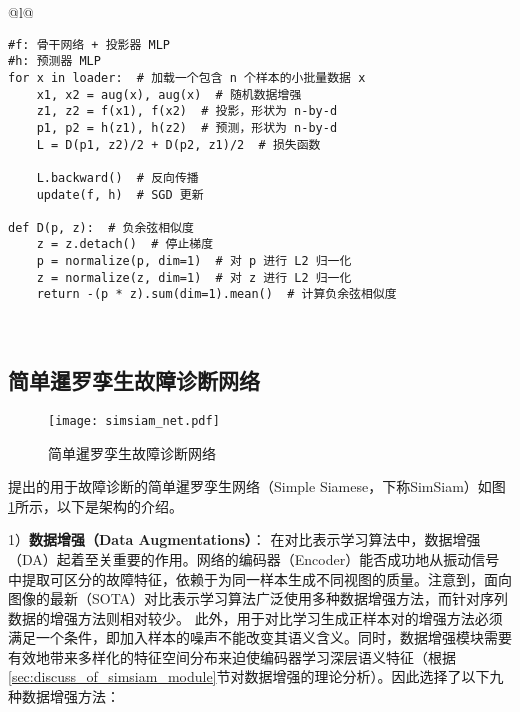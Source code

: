 \documentclass[master]{thesis-uestc}
\begin{document}
\begin{table}
    \caption{简单暹罗孪生网络的伪代码，用Pytorch描述}
    \begin{tabular}{@{}l@{}} %
    \toprule
     \\ %
    \midrule
    \begin{lstlisting}[basicstyle=\ttfamily,frame=none]
#f: 骨干网络 + 投影器 MLP
#h: 预测器 MLP
for x in loader:  # 加载一个包含 n 个样本的小批量数据 x
    x1, x2 = aug(x), aug(x)  # 随机数据增强
    z1, z2 = f(x1), f(x2)  # 投影，形状为 n-by-d
    p1, p2 = h(z1), h(z2)  # 预测，形状为 n-by-d
    L = D(p1, z2)/2 + D(p2, z1)/2  # 损失函数

    L.backward()  # 反向传播
    update(f, h)  # SGD 更新

def D(p, z):  # 负余弦相似度
    z = z.detach()  # 停止梯度
    p = normalize(p, dim=1)  # 对 p 进行 L2 归一化
    z = normalize(z, dim=1)  # 对 z 进行 L2 归一化
    return -(p * z).sum(dim=1).mean()  # 计算负余弦相似度
    \end{lstlisting} \\
    \bottomrule
    \end{tabular}
    \label{table:simsiam_code}
\end{table}
\subsection{简单暹罗孪生故障诊断网络}
\begin{figure}[h]
    \centering
    \texttt{[image: simsiam\_net.pdf]}
    \caption{简单暹罗孪生故障诊断网络}
    \label{simsiam_net}
\end{figure}
提出的用于故障诊断的简单暹罗孪生网络（Simple Siamese，下称SimSiam）如图\ref{simsiam_net}所示，以下是架构的介绍。

1）\textbf{数据增强（Data Augmentations）}：
在对比表示学习算法中，数据增强（DA）起着至关重要的作用。网络的编码器（Encoder）能否成功地从振动信号中提取可区分的故障特征，依赖于为同一样本生成不同视图的质量。注意到，面向图像的最新（SOTA）对比表示学习算法广泛使用多种数据增强方法，而针对序列数据的增强方法则相对较少。
此外，用于对比学习生成正样本对的增强方法必须满足一个条件，即加入样本的噪声不能改变其语义含义。同时，数据增强模块需要有效地带来多样化的特征空间分布来迫使编码器学习深层语义特征（根据\ref{sec:discuss_of_simsiam_module}节对数据增强的理论分析）。因此选择了以下九种数据增强方法：
\end{document}
